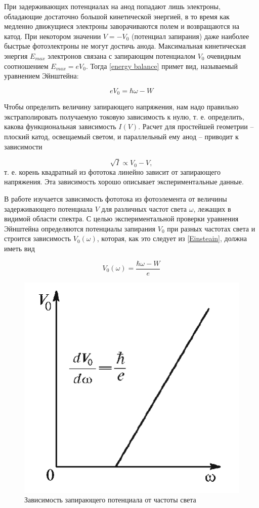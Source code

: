 	При задерживающих потенциалах на анод попадают лишь электроны, обладающие достаточно большой кинетической энергией, в то время
	как медленно движущиеся электроны заворачиваются полем и возвращаются на катод. При некотором значении $V = -V_0$ (потенциал запирания) даже наиболее быстрые фотоэлектроны не могут достичь анода.
	Максимальная кинетическая энергия $ E_{max} $ электронов связана с запирающим потенциалом $V_0$ очевидным соотношением $E_{max} = eV_0$. Тогда \eqref{energy balance} примет вид, называемый уравнением Эйнштейна:
	
	\begin{equation}
        \label{Einsteain}
	    eV_0 = \hbar\omega - W 
	\end{equation}
	
	Чтобы определить величину запирающего напряжения, нам надо правильно экстраполировать получаемую токовую зависимость к нулю, т. е. определить, какова функциональная зависимость $I(V)$. Расчет для простейшей геометрии -- плоский катод, освещаемый светом, и параллельный ему анод -- приводит к зависимости
	
	\begin{equation}
        \label{sqrt I = V}
	    \sqrt{I} \propto V_0 - V,
	\end{equation}
	т. е. корень квадратный из фототока линейно зависит от запирающего напряжения. Эта зависимость хорошо описывает экспериментальные данные.
	
	В работе изучается зависимость фототока из фотоэлемента от величины задерживающего потенциала $V$ для различных частот света $\omega$, лежащих в видимой области спектра. С целью экспериментальной проверки уравнения Эйнштейна определяются потенциалы запирания
	$V_0$ при разных частотах света и строится зависимость $ V_0(\omega) $, которая, как это следует из \eqref{Einsteain}, должна иметь вид
	
	\begin{equation}
        \label{V(w)}
	    V_0 (\omega) = \dfrac{\hbar\omega - W}{e}
	\end{equation}

    \begin{figure}[h!]
        \centering
        \includegraphics[width = 6.8 cm]{images/V_omega_th}
        \caption{Зависимость запирающего потенциала от частоты света}
        \label{pict V(w)}
    \end{figure}
	
